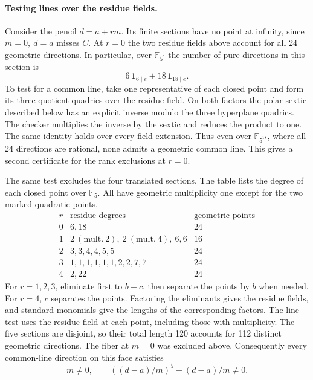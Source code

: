 \paragraph{Testing lines over the residue fields.}
Consider the pencil \(d=a+rm\). Its finite sections have no point at
infinity, since \(m=0,\ d=a\) misses \(C\). At \(r=0\) the two residue
fields above account for all 24 geometric directions. In particular,
over \(\mathbb F_{5^e}\) the number of pure directions in this section is
\[
   6\,\mathbf{1}_{6\mid e}+18\,\mathbf{1}_{18\mid e}.
\]
To test for a common line, take one representative of each closed point
and form its three quotient quadrics over the residue field. On both
factors the polar sextic described below has an explicit inverse
modulo the three hyperplane quadrics. The checker multiplies the inverse
by the sextic and reduces the product to one. The same identity holds
over every field extension. Thus even over \(\mathbb F_{5^{18}}\),
where all 24 directions are rational, none admits a geometric common
line. This gives a second certificate for the rank exclusions at \(r=0\).

The same test excludes the four translated sections. The table lists
the degree of each closed point over \(\mathbb F_5\). All have geometric
multiplicity one except for the two marked quadratic points.
\[
\begin{array}{c|l|r}
 r & \text{residue degrees} & \text{geometric points} \\ \hline
 0 & 6,18 &24\\
 1 & 2\ (\mathrm{mult.}\ 2),\ 2\ (\mathrm{mult.}\ 4),\ 6,6 &16\\
 2 & 3,3,4,4,5,5 &24\\
 3 & 1,1,1,1,1,1,2,2,7,7 &24\\
 4 & 2,22 &24
\end{array}
\]
For \(r=1,2,3\), eliminate first to \(b+c\), then separate the points
by \(b\) when needed. For \(r=4\), \(c\) separates the points. Factoring
the eliminants gives the residue fields, and standard monomials give
the lengths of the corresponding factors. The line test uses the
residue field at each point, including those with multiplicity.
The five sections are disjoint, so their total length 120 accounts for
112 distinct geometric directions. The fiber at \(m=0\) was excluded
above. Consequently every common-line direction on this face satisfies
\[
           m\ne0,\qquad ((d-a)/m)^5-(d-a)/m\ne0.
\]

